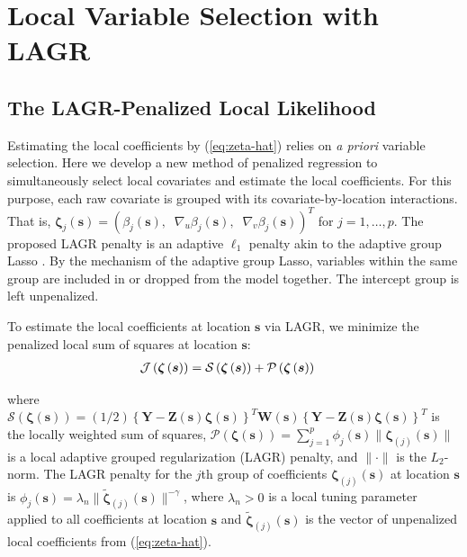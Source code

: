 \documentclass[authoryear,review, 12pt]{elsarticle}
\begin{document}
\section{Local Variable Selection with LAGR\label{sec:lagr-gaussian}}


\subsection{The LAGR-Penalized Local Likelihood}

Estimating the local coefficients by (\ref{eq:zeta-hat}) relies on
\emph{a priori} variable selection. Here we develop a new method of
penalized regression to simultaneously select local covariates and
estimate the local coefficients. For this purpose, each raw covariate
is grouped with its covariate-by-location interactions. That is, $\bm{\zeta}_{j}(\bm{s})=\left(\beta_{j}(\bm{s}),\;\;\nabla_{u}\beta_{j}(\bm{s}),\;\;\nabla_{v}\beta_{j}(\bm{s})\right)^{T}$
for $j=1,\dots,p$. The proposed LAGR penalty is an adaptive $\ell_{1}$
penalty akin to the adaptive group Lasso \citep{Wang-Leng-2008,Zou-2006}.
By the mechanism of the adaptive group Lasso, variables within the
same group are included in or dropped from the model together. The
intercept group is left unpenalized.

To estimate the local coefficients at location $\bm{s}$ via LAGR,
we minimize the penalized local sum of squares at location $\bm{s}$:
\begin{align}
\mathcal{J}\left(\bm{\zeta}\left(\bm{s}\right)\right) & =\mathcal{S}\left(\bm{\zeta}\left(\bm{s}\right)\right)+\mathcal{P}\left(\bm{\zeta}\left(\bm{s}\right)\right)\notag\label{eq:adaptive-lasso-WLS}
\end{align}


where $\mathcal{S}\left(\bm{\zeta}\left(\bm{s}\right)\right)=(1/2)\left\{ \bm{Y}-\bm{Z}(\bm{s})\bm{\zeta}(\bm{s})\right\} ^{T}\bm{W}(\bm{s})\left\{ \bm{Y}-\bm{Z}(\bm{s})\bm{\zeta}(\bm{s})\right\} ^{T}$
is the locally weighted sum of squares, $\mathcal{P}\left(\bm{\zeta}\left(\bm{s}\right)\right)=\sum_{j=1}^{p}\phi_{j}(\bm{s})\|\bm{\zeta}_{\left(j\right)}(\bm{s})\|$
is a local adaptive grouped regularization (LAGR) penalty, and $\|\cdot\|$
is the $L_{2}$-norm. The LAGR penalty for the $j$th group of coefficients
$\bm{\zeta}_{\left(j\right)}(\bm{s})$ at location $\bm{s}$ is $\phi_{j}(\bm{s})=\lambda_{n}\|\tilde{\bm{\zeta}}_{\left(j\right)}(\bm{s})\|^{-\gamma}$,
where $\lambda_{n}>0$ is a local tuning parameter applied to all
coefficients at location $\bm{s}$ and $\tilde{\bm{\zeta}}_{\left(j\right)}(\bm{s})$
is the vector of unpenalized local coefficients from (\ref{eq:zeta-hat}).
\end{document}
